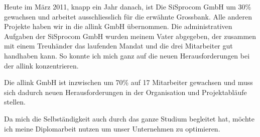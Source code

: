 Heute im März 2011, knapp ein Jahr danach, ist Die SiSprocom GmbH um 30\% 
gewachsen und arbeitet ausschliesslich für die erwähnte Grossbank. Alle anderen Projekte
haben wir in die allink GmbH übernommen. Die administrativen Aufgaben der
SiSprocom GmbH wurden
meinem Vater abgegeben, der zusammen mit einem Treuhänder das laufenden
Mandat und die drei Mitarbeiter gut handhaben kann. So konnte ich mich ganz
auf die neuen Herausforderungen bei der allink konzentrieren.

Die allink GmbH ist inzwischen um 70\% auf 17 Mitarbeiter gewachsen und muss sich dadurch
neuen Herausforderungen in der Organisation und Projektabläufe stellen.

Da mich die Selbständigkeit auch durch das ganze Studium begleitet hat, möchte 
ich meine Diplomarbeit nutzen um unser Unternehmen zu optimieren.